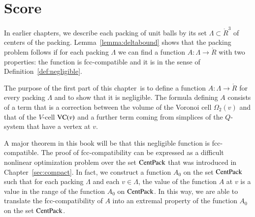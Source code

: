 


\section{Score}

\label{sec:scoring}

In earlier chapters, we describe each packing of unit balls by its set
$\Lambda\subset \ring{R}^3$ of centers of the packing.  
Lemma~\ref{lemma:deltabound} shows that the
packing problem follows if for each %
packing $\Lambda$ we
can find a function $A:\Lambda\to\ring{R}$ with two properties: the
function is fcc-compatible and it is 
in the sense of
Definition~\ref{def:negligible}.

The purpose of the first part of this chapter\ is to define a
function $A:\Lambda\to\ring{R}$ for every 
packing
$\Lambda$ and to show that it is negligible.  The formula defining
$A$ consists of a term that is a correction between the volume of
the Voronoi cell $\Omega_2(v)$ and that of the $V$-cell ${\operatorname{VC}}(v)$
and a further term coming from simplices of the $Q$-system that
have a vertex at $v$.

A major theorem in this book will be that this negligible
function is fcc-compatible.  The proof of fcc-compatibility can be
expressed as a difficult nonlinear optimization problem over the
set ${\operatorname{CentPack}}$ that was introduced in Chapter~\ref{sec:compact}.  In
fact, we construct a  function $A_0$ on the set ${\operatorname{CentPack}}$ such
that for each %
packing $\Lambda$ and each $v\in\Lambda$,
the value of the function $A$ at $v$ is a value in the range of
the function $A_0$ on ${\operatorname{CentPack}}$. In this way, we are able to
translate the fcc-compatibility of $A$ into an extremal property
of the function $A_0$ on the set ${\operatorname{CentPack}}$.

